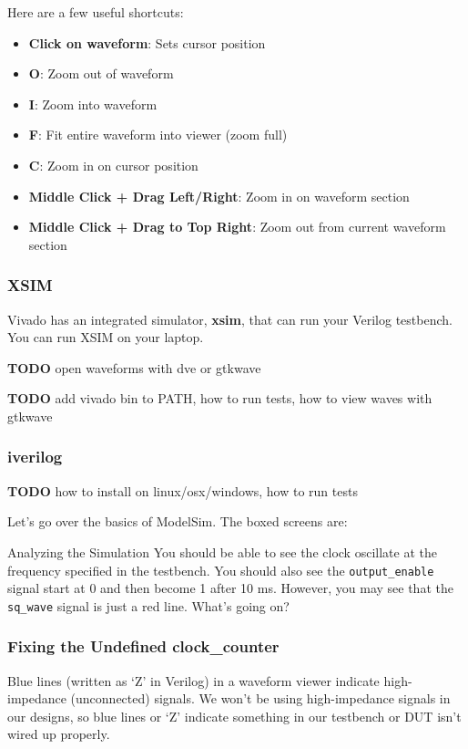 \documentclass[11pt]{article}
\makeatletter
\renewcommand{\subsection}
{\@startsection {subsection}{1}{0pt}
 {-1ex}
 {0.5ex}
 {\bfseries\normalsize}}
\makeatother
\begin{document}
Here are a few useful shortcuts:

\begin{itemize}
	\item \textbf{Click on waveform}: Sets cursor position
	\item \textbf{O}: Zoom out of waveform
	\item \textbf{I}: Zoom into waveform
	\item \textbf{F}: Fit entire waveform into viewer (zoom full)
	\item \textbf{C}: Zoom in on cursor position
	\item \textbf{Middle Click + Drag Left/Right}: Zoom in on waveform section
	\item \textbf{Middle Click + Drag to Top Right}: Zoom out from current waveform section
\end{itemize}

\subsubsection{XSIM}
Vivado has an integrated simulator, \textbf{xsim}, that can run your Verilog testbench.
You can run XSIM on your laptop.

\textbf{TODO} open waveforms with dve or gtkwave

\textbf{TODO} add vivado bin to PATH, how to run tests, how to view waves with gtkwave

\subsubsection{iverilog}
\textbf{TODO} how to install on linux/osx/windows, how to run tests

Let's go over the basics of ModelSim. The boxed screens are:

\subsection{Analyzing the Simulation}
You should be able to see the clock oscillate at the frequency specified in the testbench.
You should also see the \verb|output_enable| signal start at 0 and then become 1 after 10 ms.
However, you may see that the \verb|sq_wave| signal is just a red line. What's going on?

\subsubsection{Fixing the Undefined clock\_counter}
Blue lines (written as `Z' in Verilog) in a waveform viewer indicate high-impedance (unconnected) signals.
We won't be using high-impedance signals in our designs, so blue lines or `Z' indicate something in our testbench or DUT isn't wired up properly.
\end{document}

